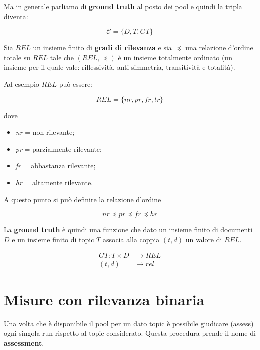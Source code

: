 \noindent Ma in generale parliamo di \textbf{ground truth} al posto dei pool e quindi la tripla diventa:

$$
\mathcal{C} = \{D, T, GT\}
$$

\noindent Sia $REL$ un insieme finito di \textbf{gradi di rilevanza} e sia $\preceq$ una relazione d'ordine totale su $REL$ tale che $(REL, \preceq)$ è un insieme totalmente ordinato (un insieme per il quale vale: riflessività, anti-simmetria, transitività e totalità).

Ad esempio $REL$ può essere:

$$
REL = \{nr, pr, fr, tr \}
$$

\noindent dove 
\begin{itemize}
	\item \textit{nr} = non rilevante;
	\item \textit{pr} = parzialmente rilevante;
	\item \textit{fr} = abbastanza rilevante;
	\item \textit{hr} = altamente rilevante.
\end{itemize}

\noindent A questo punto si può definire la relazione d'ordine

$$
nr \preceq pr \preceq fr \preceq hr
$$

La \textbf{ground truth} è quindi una funzione che dato un insieme finito di documenti $D$ e un insieme finito di topic $T$ associa alla coppia $(t,d)$ un valore di $REL$.

\begin{align*}
	GT : T \times D &\to REL \\
		(t,d) &\to rel
\end{align*}

\section{Misure con rilevanza binaria}

Una volta che è disponibile il pool per un dato topic è possibile giudicare (assess) ogni singola run rispetto al topic considerato.
Questa procedura prende il nome di \textbf{assessment}.

